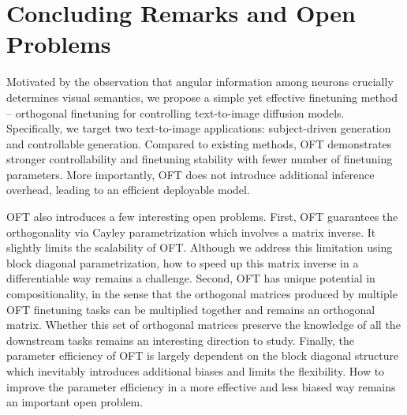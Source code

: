 \vspace{-2mm}
\section{Concluding Remarks and Open Problems}
\vspace{-1.5mm}


Motivated by the observation that angular information among neurons crucially determines visual semantics, we propose a simple yet effective finetuning method – orthogonal finetuning for controlling text-to-image diffusion models. Specifically, we target two text-to-image applications: subject-driven generation and controllable generation. Compared to existing methods, OFT demonstrates stronger controllability and finetuning stability with fewer number of finetuning parameters. More importantly, OFT does not introduce additional inference overhead, leading to an efficient deployable model.

OFT also introduces a few interesting open problems. First, OFT guarantees the orthogonality via Cayley parametrization which involves a matrix inverse. It slightly limits the scalability of OFT. Although we address this limitation using block diagonal parametrization, how to speed up this matrix inverse in a differentiable way remains a challenge. Second, OFT has unique potential in compositionality, in the sense that the orthogonal matrices produced by multiple OFT finetuning tasks can be multiplied together and remains an orthogonal matrix. Whether this set of orthogonal matrices preserve the knowledge of all the downstream tasks remains an interesting direction to study. Finally, the parameter efficiency of OFT is largely dependent on the block diagonal structure which inevitably introduces additional biases and limits the flexibility. How to improve the parameter efficiency in a more effective and less biased way remains an important open problem.

\newpage

